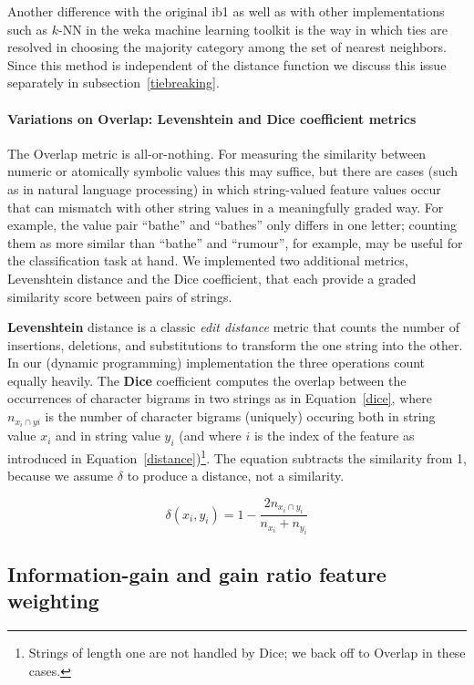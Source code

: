 \documentclass{report}
\begin{document}
Another difference with the original {\sc ib1} as well as with other
implementations such as $k$-NN in the {\sc weka} machine learning
toolkit \cite{Witten+99} is the way in which ties are resolved in
choosing the majority category among the set of nearest
neighbors. Since this method is independent of the distance function
we discuss this issue separately in subsection~\ref{tiebreaking}.

\paragraph{Variations on Overlap: Levenshtein and Dice coefficient metrics}

The Overlap metric is all-or-nothing. For measuring the similarity
between numeric or atomically symbolic values this may suffice, but
there are cases (such as in natural language processing) in which
string-valued feature values occur that can mismatch with other string
values in a meaningfully graded way. For example, the value pair
``bathe'' and ``bathes'' only differs in one letter; counting them as
more similar than ``bathe'' and ``rumour'', for example, may be useful
for the classification task at hand. We implemented two additional
metrics, Levenshtein distance and the Dice coefficient, that each
provide a graded similarity score between pairs of strings.

{\bf Levenshtein} distance is a classic {\em edit distance}\/ metric
\cite{Levenshtein66} that counts the number of insertions, deletions,
and substitutions to transform the one string into the other. In our
(dynamic programming) implementation the three operations count
equally heavily. The {\bf Dice} coefficient computes the overlap
between the occurrences of character bigrams in two strings as in
Equation~\ref{dice}, where $n_{x_{i} \cap y{i}}$ is the number of
character bigrams (uniquely) occuring both in string value $x_{i}$ and
in string value $y_{i}$ (and where $i$ is the index of the feature as
introduced in Equation~\ref{distance})\footnote{Strings of length one
  are not handled by Dice; we back off to Overlap in these
  cases.}. The equation subtracts the similarity from 1, because we
assume $\delta$ to produce a distance, not a similarity.

\begin{equation}
\delta(x_{i}, y_{i}) = 1 - \frac{2 n_{x_{i} \cap y_{i}}}{n_{x_{i}} + n_{y_{i}}}
\label{dice}
\end{equation}

\subsection{Information-gain and gain ratio feature weighting}
\label{infogain}
\end{document}
